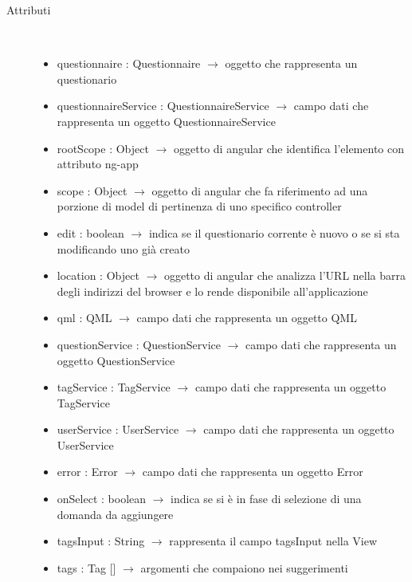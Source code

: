 \begin{description}
\item[Attributi] \hfill \\
\vspace{-7mm}
\begin{itemize}
	\item questionnaire : Questionnaire $\rightarrow$ oggetto che rappresenta un questionario
	\item questionnaireService : QuestionnaireService $\rightarrow$ campo dati che rappresenta un oggetto QuestionnaireService
	\item rootScope : Object $\rightarrow$ oggetto di angular che identifica l’elemento con attributo ng-app
	\item scope : Object $\rightarrow$ oggetto di angular che fa riferimento ad una porzione di model di pertinenza di uno specifico controller
	\item edit : boolean $\rightarrow$ indica se il questionario corrente è nuovo o se si sta modificando uno già creato
	\item location : Object $\rightarrow$ oggetto di angular che analizza l'URL nella barra degli indirizzi del browser e lo rende disponibile all'applicazione
	\item qml : QML $\rightarrow$ campo dati che rappresenta un oggetto QML
	\item questionService : QuestionService $\rightarrow$ campo dati che rappresenta un oggetto QuestionService
	\item tagService : TagService $\rightarrow$ campo dati che rappresenta un oggetto TagService
	\item userService : UserService $\rightarrow$ campo dati che rappresenta un oggetto UserService
	\item error : Error $\rightarrow$ campo dati che rappresenta un oggetto Error
	\item onSelect : boolean $\rightarrow$ indica se si è in fase di selezione di una domanda da aggiungere
	\item tagsInput : String $\rightarrow$ rappresenta il campo tagsInput nella View
	\item tags : Tag [] $\rightarrow$ argomenti che compaiono nei suggerimenti
\end{itemize}


\end{description}
